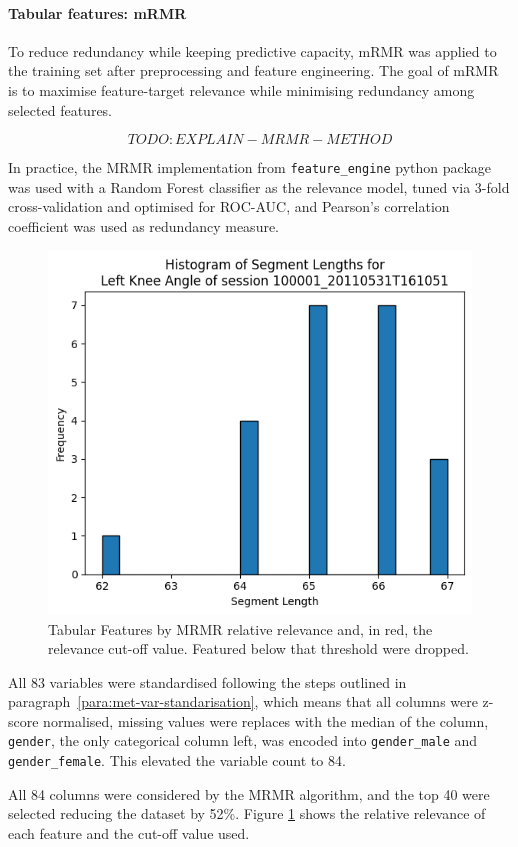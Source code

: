 \paragraph{Tabular features: mRMR}
To reduce redundancy while keeping predictive capacity, mRMR \citep{DING2005} was applied to the training set after preprocessing and feature engineering. The goal of mRMR is to maximise feature-target relevance while minimising redundancy among selected features.

\begin{equation}
TODO: EXPLAIN-MRMR-METHOD
\end{equation}

In practice, the MRMR implementation from \texttt{feature\_engine} python package was used with a Random Forest classifier as the relevance model, tuned via 3-fold cross-validation and optimised for ROC-AUC, and Pearson's correlation coefficient was used as redundancy measure.

\begin{figure}[ht]
    \centering
    \includegraphics[width=0.5\columnwidth]{images/hist_segment_lengths_L_knee_angle.png}
    \caption[Tabular Features by MRMR relative relevance]{Tabular Features by MRMR relative relevance and, in red, the relevance cut-off value. Featured below that threshold were dropped.\label{fig:met-mrm-feat-sel}}
\end{figure}

All 83 variables were standardised following the steps outlined in paragraph~\ref{para:met-var-standarisation}, which means that all columns were z-score normalised, missing values were replaces with the median of the column, \texttt{gender}, the only categorical column left, was encoded into \texttt{gender_male} and \texttt{gender_female}. This elevated the variable count to 84.

All 84 columns were considered by the MRMR algorithm, and the top 40 were selected reducing the dataset by 52\%. Figure \ref{fig:met-mrm-feat-sel} shows the relative relevance of each feature and the cut-off value used.

